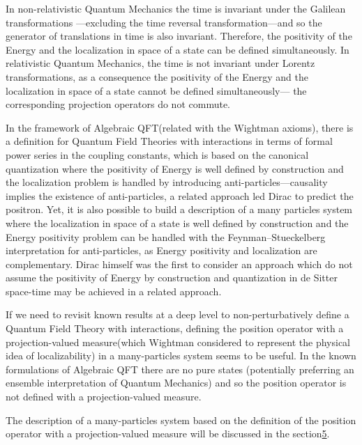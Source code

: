 \documentclass[11pt]{book}
\begin{document}
In non-relativistic Quantum Mechanics the time is invariant under the
Galilean transformations ---excluding the time reversal
transformation---and so the generator of translations in time is also
invariant. Therefore, the positivity of the Energy and the localization
in space of a state can be defined simultaneously. In relativistic
Quantum Mechanics, the time is not invariant under Lorentz
transformations, as a consequence the positivity of the Energy and the
localization in space of a state cannot be defined simultaneously--- the
corresponding projection operators do not commute.

In the framework of Algebraic QFT(related with the Wightman axioms),
there is a definition for Quantum Field Theories with interactions in
terms of formal power series in the coupling
constants\cite{Brunetti2002Modular}, which is based on the canonical quantization where the
positivity of Energy is well defined by construction and the
localization problem is handled by introducing
anti-particles---causality implies the existence of
anti-particles\cite{Weinberg1995quantum}, a related approach led Dirac to predict the
positron\cite{Dimock2011Dirac}. Yet, it
is also possible to build a description of a many particles system where
the localization in space of a state is well defined by construction and
the Energy positivity problem can be handled with the
Feynman--Stueckelberg interpretation for anti-particles, as Energy
positivity and localization are complementary. Dirac himself was the
first to consider an approach which do not assume the positivity of
Energy by construction\cite{Dirac1942Bakerian} and quantization in de Sitter space-time may be achieved in a
related approach\cite{Gazeau2000Gupta}.

If we need to revisit known results at a deep level to
non-perturbatively define a Quantum Field Theory with
interactions\cite{Jaffe2006Quantum}, defining the position operator with a projection-valued
measure(which Wightman considered to represent the physical idea of
localizability) in a many-particles system seems to be useful. In the
known formulations of Algebraic QFT there are no pure states
(potentially preferring an ensemble interpretation of Quantum
Mechanics)\cite{Brunetti2002Modular} and so the position operator is not defined with a
projection-valued measure.

The description of a many-particles system based on the definition of
the position operator with a projection-valued measure will be discussed
in the section\protect\hyperlink{section:Energy}{5}.
\end{document}
